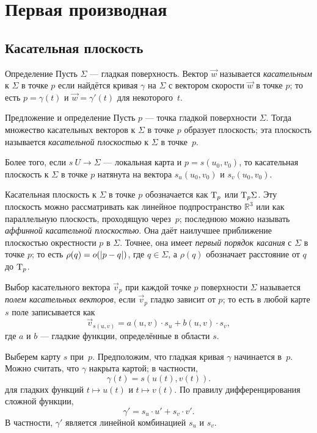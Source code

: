 \chapter{Первая производная}
\label{chap:first-order}
\section{Касательная плоскость}

\begin{thm}{Определение}\label{def:tangent-vector}
Пусть $\Sigma$ --- гладкая поверхность.
Вектор $\vec w$ называется \emph{касательным} к $\Sigma$ в точке $p$ если найдётся кривая $\gamma$ на $\Sigma$ с вектором скорости $\vec w$ в точке $p$;
то есть $p=\gamma(t)$ и $\vec w=\gamma'(t)$ для некоторого~$t$.
\end{thm}

\begin{thm}{Предложение и определение}\label{def:tangent-plane}
Пусть $p$ --- точка гладкой поверхности $\Sigma$.
Тогда множество касательных векторов к $\Sigma$ в точке $p$ образует плоскость;
эта плоскость называется \emph{касательной плоскостью} к $\Sigma$ в точке~$p$.

Более того, если $s\:U\to \Sigma$ --- локальная карта и $p=s(u_0,v_0)$, то 
касательная плоскость к $\Sigma$ в точке $p$ натянута на вектора $s_u(u_0,v_0)$ и $s_v(u_0,v_0)$.
\end{thm}

Касательная плоскость к $\Sigma$ в точке $p$ обозначается как $\mathrm{T}_p$ или $\mathrm{T}_p\Sigma$.
Эту плоскость можно рассматривать как линейное подпространство $\mathbb{R}^3$ или как параллельную плоскость, проходящую через~$p$;
последнюю можно называть \emph{аффинной касательной плоскостью}.
Она даёт наилучшее приближение плоскостью окрестности $p$ в $\Sigma$.
Точнее, 
она имеет \emph{первый порядок касания} с $\Sigma$ в точке $p$;
то есть $\rho(q)\z=o(|p\z-q|)$, где $q\in \Sigma$, а $\rho(q)$ обозначает расстояние от $q$ до $\mathrm{T}_p$.

Выбор касательного вектора $\vec v_p$ при каждой точке $p$ поверхности $\Sigma$ называется \emph{полем касательных векторов}, если $\vec v_p$ гладко зависит от $p$;
то есть в любой карте $s$ поле записывается как
\[\vec v_{s(u,v)}=a(u,v)\cdot s_u+b(u,v)\cdot s_v,\]
где $a$ и $b$ --- гладкие функции, определённые в области $s$.

Выберем карту $s$ при~$p$.
Предположим, что гладкая кривая $\gamma$ начинается в~$p$.
Можно считать, что $\gamma$ накрыта картой;
в частности, 
\[\gamma(t)=s(u(t),v(t)).\]
для гладких функций $t\mapsto u(t)$ и $t\mapsto v(t)$.
По правилу дифференцирования сложной функции, 
\[\gamma'=s_u\cdot u'+ s_v\cdot v'.\]
В частности, $\gamma'$ является линейной комбинацией $s_u$ и $s_v$.

